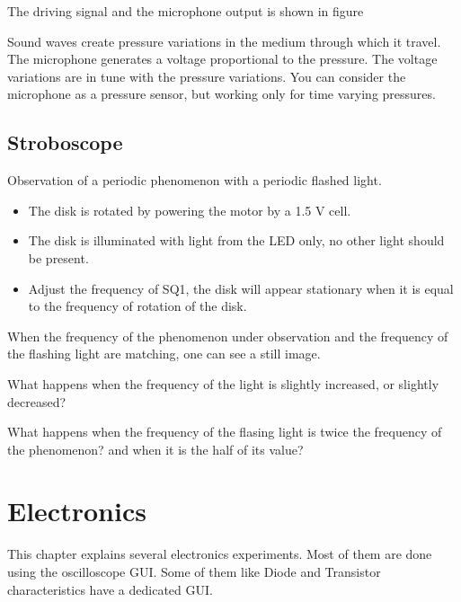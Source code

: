 \documentclass[a4paper,12pt,english]{sphinxmanual}
\let\sphinxpxdimen\pdfpxdimen\else\newdimen\sphinxpxdimen
\begin{document}
The driving signal and the microphone output is shown in figure

Sound waves create pressure variations in the medium through which it
travel. The microphone generates a voltage proportional to the pressure.
The voltage variations are in tune with the pressure variations. You can
consider the microphone as a pressure sensor, but working only for time
varying pressures.


\section{Stroboscope}
\label{\detokenize{2.21:stroboscope}}\label{\detokenize{2.21::doc}}

Observation of a periodic phenomenon with a periodic flashed light.


\noindent\sphinxincludegraphics[width=300\sphinxpxdimen]{{stroboscope}.pdf}
\begin{itemize}
\item {} 
The disk is rotated by powering the motor by a 1.5 V cell.

\item {} 
The disk is illuminated with light from the LED only, no other light
should be present.

\item {} 
Adjust the frequency of SQ1, the disk will appear stationary when it
is equal to the frequency of rotation of the disk.

\end{itemize}


When the frequency of the phenomenon under observation and the frequency
of the flashing light are matching, one can see a still image.

What happens when the frequency of the light is slightly increased, or slightly
decreased?

What happens when the frequency of the flasing light is twice the frequency
of the phenomenon? and when it is the half of its value?


\chapter{Electronics}
\label{\detokenize{index:electronics}}
This chapter explains several electronics experiments. Most of them are
done using the oscilloscope GUI. Some of them like Diode and Transistor
characteristics have a dedicated GUI.
\end{document}
